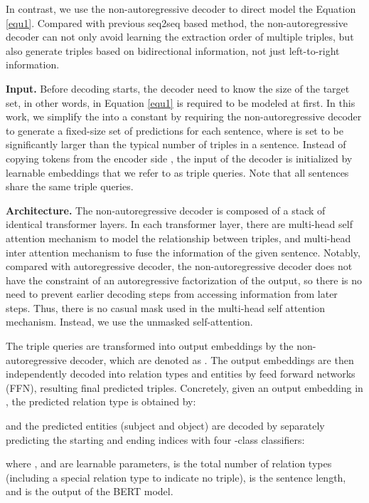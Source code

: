 \documentclass[letterpaper]{article} \usepackage{aaai21}  \usepackage{times}  \usepackage{helvet} \usepackage{courier}  \usepackage[hyphens]{url}  \usepackage{graphicx} \usepackage{amsfonts,amssymb}
\begin{document}
In contrast, we use the non-autoregressive decoder to direct model the Equation \ref{equ1}. Compared with previous seq2seq based method, the non-autoregressive decoder can not only 
avoid learning the extraction order of multiple triples, but also generate triples based on bidirectional information, not just left-to-right information.

\textbf{Input.} Before decoding starts, the decoder need to know  the size of  the target set, in other words,  in Equation \ref{equ1} is required to be modeled at first. In this work, we simplify the  into a constant by requiring the non-autoregressive decoder to generate a fixed-size set of  predictions for each sentence,  where  is set to be significantly larger than the typical number of triples in a sentence.  Instead of copying tokens from the encoder side \cite{gu2018non}, the input of the decoder is initialized by  learnable embeddings that we refer to as triple queries. Note that all sentences share the same triple queries.

\textbf{Architecture.} The non-autoregressive decoder is composed of a stack of  identical transformer layers. In each transformer layer, there are multi-head self attention mechanism to model the relationship between triples, and multi-head inter attention mechanism to fuse the information of the given sentence. Notably, compared with autoregressive decoder, the non-autoregressive decoder does not have the constraint of an autoregressive factorization of the output, so there is no need to prevent earlier decoding steps from accessing information from later steps. Thus, there is no casual mask used in the multi-head self attention mechanism. Instead, we use the unmasked self-attention.


The  triple queries are transformed into  output embeddings by the non-autoregressive decoder, which are denoted as . The output embeddings  are then independently decoded into relation types and entities by feed forward networks (FFN), resulting  final predicted triples. Concretely, given an output embedding  in , the predicted relation type is obtained by:

and the predicted entities (subject and object) are decoded by separately predicting the starting and ending indices with four -class classifiers:

where ,  and  are learnable parameters,  is the total number of relation types (including a special relation type  to indicate no triple),  is the sentence length, and  is the output of the BERT model.
\end{document}
